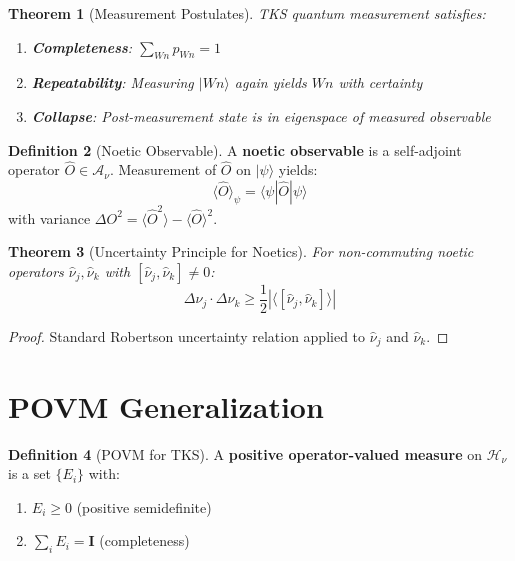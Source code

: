 \documentclass[11pt,twoside,openright]{book}
\theoremstyle{definition}
\newtheorem{definition}{Definition}[chapter]
\theoremstyle{plain}
\newtheorem{theorem}[definition]{Theorem}
\theoremstyle{remark}
\newcommand{\Hspace}{\mathcal{H}}
\newcommand{\qket}[1]{|#1\rangle}
\newcommand{\qbra}[1]{\langle #1|}
\newcommand{\qop}[1]{\hat{#1}}
\begin{document}
\begin{theorem}[Measurement Postulates]
\label{thm:measurement-postulates}
TKS quantum measurement satisfies:
\begin{enumerate}
  \item \textbf{Completeness}: $\sum_{Wn} p_{Wn} = 1$
  \item \textbf{Repeatability}: Measuring $\qket{Wn}$ again yields $Wn$ with certainty
  \item \textbf{Collapse}: Post-measurement state is in eigenspace of measured observable
\end{enumerate}
\end{theorem}

\begin{definition}[Noetic Observable]
\label{def:noetic-observable}
A \textbf{noetic observable} is a self-adjoint operator $\qop{O} \in \mathcal{A}_\nu$. Measurement of $\qop{O}$ on $\qket{\psi}$ yields:
\[
\langle \qop{O} \rangle_\psi = \qbra{\psi}\qop{O}\qket{\psi}
\]
with variance $\Delta O^2 = \langle \qop{O}^2 \rangle - \langle \qop{O} \rangle^2$.
\end{definition}

\begin{theorem}[Uncertainty Principle for Noetics]
\label{thm:uncertainty}
For non-commuting noetic operators $\qop{\nu}_j, \qop{\nu}_k$ with $[\qop{\nu}_j, \qop{\nu}_k] \neq 0$:
\[
\Delta \nu_j \cdot \Delta \nu_k \geq \frac{1}{2} |\langle [\qop{\nu}_j, \qop{\nu}_k] \rangle|
\]
\end{theorem}

\begin{proof}
Standard Robertson uncertainty relation applied to $\qop{\nu}_j$ and $\qop{\nu}_k$.
\end{proof}

\section{POVM Generalization}

\begin{definition}[POVM for TKS]
\label{def:povm}
A \textbf{positive operator-valued measure} on $\Hspace_\nu$ is a set $\{E_i\}$ with:
\begin{enumerate}
  \item $E_i \geq 0$ (positive semidefinite)
  \item $\sum_i E_i = \mathbf{I}$ (completeness)
\end{enumerate}
\end{definition}
\end{document}
